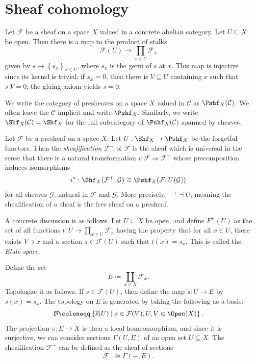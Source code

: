
\section{Sheaf cohomology}

Let $\mathcal{F} $ be a sheaf on a space $X$ valued in a concrete abelian category. Let $U\subseteq X$ be open. Then there is a map to the product of stalks
\[
	\mathcal{F} (U)\to \prod_{x\in U} \mathcal{F} _x
\]
given by $s\mapsto \left\{ s_x \right\}_{x\in U} $, where $s_x$ is the germ of $s$ at $x$. This map is injective since its kernel is trivial: if $s_x=0$, then there is $V\subseteq U$ containing $x$ such that $s|V=0$; the gluing axiom yields $s=0$.

\begin{notation}\label{4.1.1}
	We write the category of presheaves on a space $X$ valued in $\mathcal{C} $ as $\Pshf_X(\mathcal{C} )$. We often leave the $\mathcal{C} $ implicit and write $\Pshf _X$. Similarly, we write $\Shf _X(\mathcal{C} )=\Shf _X$ for the full subcategory of $\Pshf_X(\mathcal{C} )$ spanned by sheaves.
\end{notation}


\begin{construction}\label{4.1.2}
	Let $\mathcal{F} $ be a presheaf on a space $X$. Let $U : \Shf_X  \to \Pshf_X$ be the forgetful functors. Then the \emph{sheafification} $\mathcal{F} ^+$ of $\mathcal{F} $ is the sheaf which is universal in the sense that there is a natural transformation $i : \mathcal{F}  \Rightarrow \mathcal{F} ^+$ whose precomposition induces isomorphisms
	\[
		i^* : \Shf_X (\mathcal{F} ^+,\mathcal{G} )\cong \Pshf_X (\mathcal{F} ,U(\mathcal{G} ))
	\]
	for all sheaves $\mathcal{G} $, natural in $\mathcal{F} $ and $\mathcal{G} $. More precisely, $-^+ \dashv U$, meaning the sheafification of a sheaf is the free sheaf on a presheaf.

	A concrete discussion is as follows. Let $U\subseteq X$ be open, and define $F^+(U)$ as the set of all functions $t : U\to \prod_{x\in U} \mathcal{F} _x$ having the property that for all $x\in U$, there exists $V\ni x$ and a section $s\in \mathcal{F} (U)$ such that $t(x)=s_x$. This is called the \emph{Etal\'e space}.

	Define the set
	\[
		E\coloneqq \coprod_{x\in X} \mathcal{F} _x
	.\]
	Topologize it as follows. If $s\in \mathcal{F} (U)$, then define the map $\widetilde{s} : U \to E$ by $\widetilde{s} (x)=s_x$. The topology on $E$ is generated by taking the following as a basis:
	\[
		\mathcal{B}\coloneqq \left\{ \widetilde{s} (U)\mid s\in \mathcal{F} (V),U,V\in \Open(X)  \right\} 
	.\]
	The projection $\pi : E \to X$ is then a local homeomorphism, and since it is surjective, we can consider sections $\Gamma (U,E)$ of an open set $U\subseteq X$. The sheafification $\mathcal{F} ^+$ can be defined as the sheaf of sections
	\[
		\mathcal{F}^+ \cong \Gamma (-,E)
	.\]
\end{construction}

